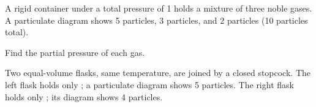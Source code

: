 \documentclass{apchem-exam}
\begin{document}

A rigid container under a total pressure of \SI{1}{\atm} holds a mixture
of three noble gases. A particulate diagram shows 5  particles,
3  particles, and 2  particles (10 particles total).

Find the partial pressure of each gas.
\workspace[3.5cm]

\begin{rubric}
\end{rubric}


Two equal-volume flasks, same temperature, are joined by a closed
stopcock. The left flask holds only ; a particulate diagram shows
5  particles. The right flask holds only ; its diagram
shows 4  particles.
\end{document}
